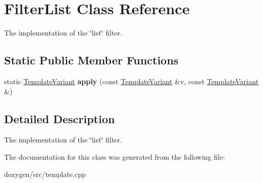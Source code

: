 \hypertarget{class_filter_list}{}\section{Filter\+List Class Reference}
\label{class_filter_list}


The implementation of the \char`\"{}list\char`\"{} filter.  


\subsection*{Static Public Member Functions}
\begin{DoxyCompactItemize}
\item 
\mbox{\label{class_filter_list_a7ed00ddac13e8e704fe45d5baf7e8c2b}} 
static \mbox{\hyperlink{class_template_variant}{Template\+Variant}} {\bfseries apply} (const \mbox{\hyperlink{class_template_variant}{Template\+Variant}} \&v, const \mbox{\hyperlink{class_template_variant}{Template\+Variant}} \&)
\end{DoxyCompactItemize}


\subsection{Detailed Description}
The implementation of the \char`\"{}list\char`\"{} filter. 

The documentation for this class was generated from the following file\+:\begin{DoxyCompactItemize}
\item 
doxygen/src/template.\+cpp\end{DoxyCompactItemize}
